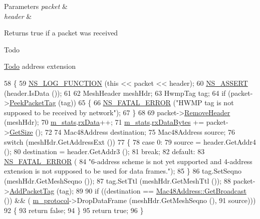 \begin{DoxyParams}{Parameters}
{\em packet} & \\
\hline
{\em header} & \\
\hline
\end{DoxyParams}
\begin{DoxyReturn}{Returns}
true if a packet was received 
\end{DoxyReturn}
\begin{DoxyRefDesc}{Todo}
\item[\hyperlink{todo__todo000116}{Todo}]address extension \end{DoxyRefDesc}

\begin{DoxyCode}
58 \{
59   \hyperlink{log-macros-disabled_8h_a90b90d5bad1f39cb1b64923ea94c0761}{NS\_LOG\_FUNCTION} (\textcolor{keyword}{this} << packet << header);
60   \hyperlink{assert_8h_a6dccdb0de9b252f60088ce281c49d052}{NS\_ASSERT} (header.IsData ());
61 
62   MeshHeader meshHdr;
63   HwmpTag tag;
64   \textcolor{keywordflow}{if} (packet->\hyperlink{classns3_1_1Packet_a1734de11f2ca1e78a7872461a0625168}{PeekPacketTag} (tag))
65     \{
66       \hyperlink{group__fatal_ga5131d5e3f75d7d4cbfd706ac456fdc85}{NS\_FATAL\_ERROR} (\textcolor{stringliteral}{"HWMP tag is not supposed to be received by network"});
67     \}
68 
69   packet->\hyperlink{classns3_1_1Packet_a0961eccf975d75f902d40956c93ba63e}{RemoveHeader} (meshHdr);
70   \hyperlink{classns3_1_1dot11s_1_1HwmpProtocolMac_a72bb14d6985cc79bef9ac33fdcdb0a00}{m\_stats}.\hyperlink{structns3_1_1dot11s_1_1HwmpProtocolMac_1_1Statistics_a86cc234b540b881cb752768f22345d77}{rxData}++;
71   \hyperlink{classns3_1_1dot11s_1_1HwmpProtocolMac_a72bb14d6985cc79bef9ac33fdcdb0a00}{m\_stats}.\hyperlink{structns3_1_1dot11s_1_1HwmpProtocolMac_1_1Statistics_aca61136ff1c29fb38824c88972990475}{rxDataBytes} += packet->\hyperlink{classns3_1_1Packet_a462855c9929954d4301a4edfe55f4f1c}{GetSize} ();
72 
74   Mac48Address destination;
75   Mac48Address source;
76   \textcolor{keywordflow}{switch} (meshHdr.GetAddressExt ())
77     \{
78     \textcolor{keywordflow}{case} 0:
79       source = header.GetAddr4 ();
80       destination = header.GetAddr3 ();
81       \textcolor{keywordflow}{break};
82     \textcolor{keywordflow}{default}:
83       \hyperlink{group__fatal_ga5131d5e3f75d7d4cbfd706ac456fdc85}{NS\_FATAL\_ERROR} (
84         \textcolor{stringliteral}{"6-address scheme is not yet supported and 4-address extension is not supposed to be used for data
       frames."});
85     \}
86   tag.SetSeqno (meshHdr.GetMeshSeqno ());
87   tag.SetTtl (meshHdr.GetMeshTtl ());
88   packet->\hyperlink{classns3_1_1Packet_a7400b8655852f5271c5957250d0141af}{AddPacketTag} (tag);
89 
90   \textcolor{keywordflow}{if} ((destination == \hyperlink{classns3_1_1Mac48Address_a55156e302c6bf950c0b558365adbde84}{Mac48Address::GetBroadcast} ()) && (
      \hyperlink{classns3_1_1dot11s_1_1HwmpProtocolMac_a6a05e798e264c97e2b5c484a29270b7d}{m\_protocol}->DropDataFrame (meshHdr.GetMeshSeqno (),
91                                                                                     source)))
92     \{
93       \textcolor{keywordflow}{return} \textcolor{keyword}{false};
94     \}
95   \textcolor{keywordflow}{return} \textcolor{keyword}{true};
96 \}
\end{DoxyCode}


